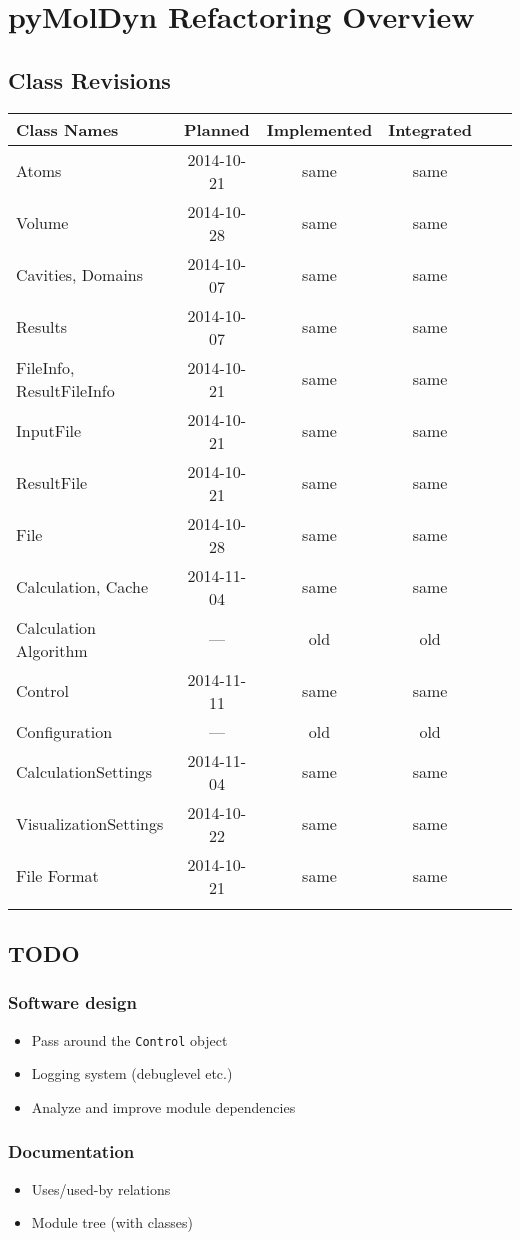 \documentclass[final, oneside, a4paper, 11pt, pdftex, english]{scrreprt}
\begin{document}
\chapter*{pyMolDyn Refactoring Overview}
\section*{Class Revisions}

\begin{tabular}{|l|c|c|c|c|c|}
    \hline
    \textbf{Class Names} & \textbf{Planned} & \textbf{Implemented} & \textbf{Integrated} \\
    \hline
    Atoms & 2014-10-21 & same & same \\
    \hline
    Volume & 2014-10-28 & same & same \\
    \hline
    Cavities, Domains & 2014-10-07 & same & same \\
    \hline
    Results & 2014-10-07 & same & same \\
    \hline
    FileInfo, ResultFileInfo & 2014-10-21 & same & same \\
    \hline
    InputFile & 2014-10-21 & same & same\\
    \hline
    ResultFile & 2014-10-21 & same & same\\
    \hline
    File & 2014-10-28 & same & same\\
    \hline
    Calculation, Cache & 2014-11-04 & same & same\\
    \hline
    Calculation Algorithm & --- & old & old \\
    \hline
    Control & 2014-11-11 & same & same \\
    \hline
    Configuration & --- & old & old \\
    \hline
    CalculationSettings & 2014-11-04 & same & same \\
    \hline
    VisualizationSettings & 2014-10-22 & same & same\\
    \hline
    File Format & 2014-10-21 & same & same \\
    \hline
    & & & \\
    \hline
\end{tabular}


\section*{TODO}
\subsection*{Software design}
\begin{itemize}\itemsep0pt
    \item Pass around the \texttt{Control} object
    \item Logging system (debuglevel etc.)
    \item Analyze and improve module dependencies
\end{itemize}


\subsection*{Documentation}
\begin{itemize}\itemsep0pt
    \item Uses/used-by relations
    \item Module tree (with classes)
\end{itemize}
\end{document}
